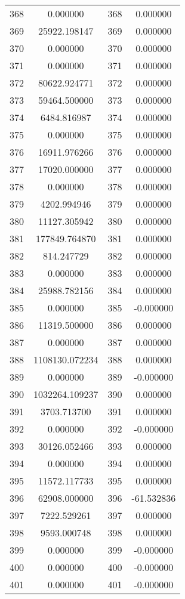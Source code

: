 \documentclass[12pt]{article}
\begin{document}
\begin{longtable}{@{}cccc@{}}
368 & 0.000000 & 368 & 0.000000 \\
369 & 25922.198147 & 369 & 0.000000 \\
370 & 0.000000 & 370 & 0.000000 \\
371 & 0.000000 & 371 & 0.000000 \\
372 & 80622.924771 & 372 & 0.000000 \\
373 & 59464.500000 & 373 & 0.000000 \\
374 & 6484.816987 & 374 & 0.000000 \\
375 & 0.000000 & 375 & 0.000000 \\
376 & 16911.976266 & 376 & 0.000000 \\
377 & 17020.000000 & 377 & 0.000000 \\
378 & 0.000000 & 378 & 0.000000 \\
379 & 4202.994946 & 379 & 0.000000 \\
380 & 11127.305942 & 380 & 0.000000 \\
381 & 177849.764870 & 381 & 0.000000 \\
382 & 814.247729 & 382 & 0.000000 \\
383 & 0.000000 & 383 & 0.000000 \\
384 & 25988.782156 & 384 & 0.000000 \\
385 & 0.000000 & 385 & -0.000000 \\
386 & 11319.500000 & 386 & 0.000000 \\
387 & 0.000000 & 387 & 0.000000 \\
388 & 1108130.072234 & 388 & 0.000000 \\
389 & 0.000000 & 389 & -0.000000 \\
390 & 1032264.109237 & 390 & 0.000000 \\
391 & 3703.713700 & 391 & 0.000000 \\
392 & 0.000000 & 392 & -0.000000 \\
393 & 30126.052466 & 393 & 0.000000 \\
394 & 0.000000 & 394 & 0.000000 \\
395 & 11572.117733 & 395 & 0.000000 \\
396 & 62908.000000 & 396 & -61.532836 \\
397 & 7222.529261 & 397 & 0.000000 \\
398 & 9593.000748 & 398 & 0.000000 \\
399 & 0.000000 & 399 & -0.000000 \\
400 & 0.000000 & 400 & -0.000000 \\
401 & 0.000000 & 401 & -0.000000 \\

\end{longtable}
\end{document}

